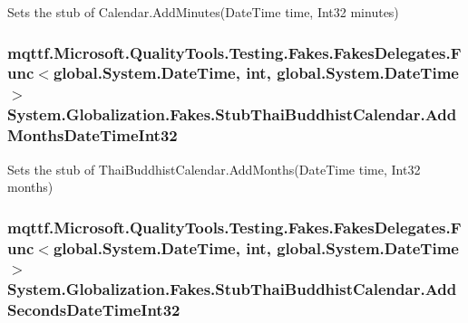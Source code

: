 Sets the stub of Calendar.\-Add\-Minutes(\-Date\-Time time, Int32 minutes)

\hypertarget{class_system_1_1_globalization_1_1_fakes_1_1_stub_thai_buddhist_calendar_a8c4b4c6bb7b1501eb672c08f1a84d477}{
\subsubsection[{Add\-Months\-Date\-Time\-Int32}]{\setlength{\rightskip}{0pt plus 5cm}mqttf.\-Microsoft.\-Quality\-Tools.\-Testing.\-Fakes.\-Fakes\-Delegates.\-Func$<$global.\-System.\-Date\-Time, int, global.\-System.\-Date\-Time$>$ System.\-Globalization.\-Fakes.\-Stub\-Thai\-Buddhist\-Calendar.\-Add\-Months\-Date\-Time\-Int32}}\label{class_system_1_1_globalization_1_1_fakes_1_1_stub_thai_buddhist_calendar_a8c4b4c6bb7b1501eb672c08f1a84d477}


Sets the stub of Thai\-Buddhist\-Calendar.\-Add\-Months(\-Date\-Time time, Int32 months)

\hypertarget{class_system_1_1_globalization_1_1_fakes_1_1_stub_thai_buddhist_calendar_a84d78e14b52cd10cc37748db8dc54eb6}{
\subsubsection[{Add\-Seconds\-Date\-Time\-Int32}]{\setlength{\rightskip}{0pt plus 5cm}mqttf.\-Microsoft.\-Quality\-Tools.\-Testing.\-Fakes.\-Fakes\-Delegates.\-Func$<$global.\-System.\-Date\-Time, int, global.\-System.\-Date\-Time$>$ System.\-Globalization.\-Fakes.\-Stub\-Thai\-Buddhist\-Calendar.\-Add\-Seconds\-Date\-Time\-Int32}}\label{class_system_1_1_globalization_1_1_fakes_1_1_stub_thai_buddhist_calendar_a84d78e14b52cd10cc37748db8dc54eb6}


